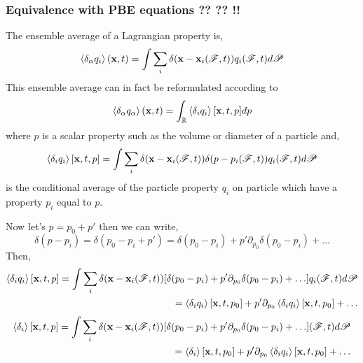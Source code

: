 \subsubsection*{Equivalence with PBE equations ?? ?? !!}

The ensemble average of a Lagrangian property is, 
\begin{equation}
    \left<\delta_\alpha q_i\right>(\textbf{x},t)
    = \int \sum_i \delta(\textbf{x} - \textbf{x}_i(\mathscr{F},t)) q_i(\mathscr{F},t) d\mathscr{P}
\end{equation}
This ensemble average can in fact be reformulated according to 
\begin{equation}
    \left<\delta_\alpha q_\alpha\right>(\textbf{x},t)
    = \int_\mathbb{R} \left<\delta_i q_i\right>[\textbf{x},t,p] dp
\end{equation}
where $p$ is a scalar property such as the volume or diameter of a particle and, 
\begin{equation}
    \left<\delta_i q_i\right>[\textbf{x},t,p]
    = \int \sum_i 
    \delta(\textbf{x} - \textbf{x}_i(\mathscr{F},t)) 
    \delta(p - p_i(\mathscr{F},t)) 
    q_i(\mathscr{F},t) d\mathscr{P}
\end{equation}
is the conditional average of the particle property $q_i$ on particle which have a property $p_i$ equal to $p$. 
 
Now let's $p = p_0 + p'$ then we can write, 
\begin{equation}
    \delta(p - p_i)
    = 
    \delta(p_0 - p_i + p' )
    = 
    \delta(p_0 - p_i  )
    + p' \partial_{p_0} \delta(p_0 - p_i  )
    + \ldots
\end{equation}
Then, 
\begin{align}
    \left<\delta_i q_i\right>[\textbf{x},t,p]
    = \int \sum_i 
    \delta(\textbf{x} - \textbf{x}_i(\mathscr{F},t)) 
    [  \delta(p_0 - p_i  )
    + p' \partial_{p_0} \delta(p_0 - p_i  )
    + \ldots]
    q_i(\mathscr{F},t) d\mathscr{P}\\
    =
    \left<\delta_i q_i\right>[\textbf{x},t,p_0]
    + p' \partial_{p_0}\left<\delta_i q_i\right>[\textbf{x},t,p_0] 
    + \ldots\\
\end{align}
\begin{align}
    \left<\delta_i\right>[\textbf{x},t,p]
    = \int \sum_i 
    \delta(\textbf{x} - \textbf{x}_i(\mathscr{F},t)) 
    [  \delta(p_0 - p_i  )
    + p' \partial_{p_0} \delta(p_0 - p_i  )
    + \ldots]
(\mathscr{F},t) d\mathscr{P}\\
    =
    \left<\delta_i\right>[\textbf{x},t,p_0]
    + p' \partial_{p_0}\left<\delta_i q_i\right>[\textbf{x},t,p_0] 
    + \ldots\\
\end{align}


